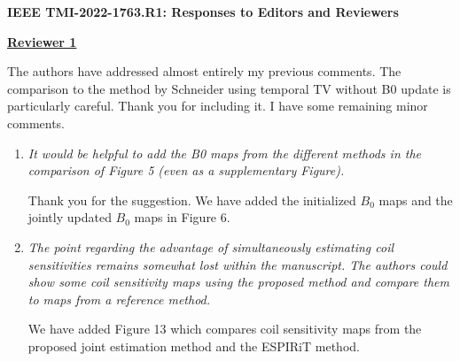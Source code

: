 \documentclass[a4paper,11pt]{report}
\begin{document}
	
\begin{center}
	{\large\textbf{IEEE TMI-2022-1763.R1: Responses to Editors and Reviewers}}
\end{center}




\noindent \underline{\textbf{Reviewer 1}}

\noindent The authors have addressed almost entirely my previous comments. The comparison to the method by Schneider using temporal TV without B0 update is particularly careful. Thank you for including it. I have some remaining minor comments.

\begin{enumerate}
	\item \textit{It would be helpful to add the B0 maps from the different methods in the comparison of Figure 5 (even as a supplementary Figure).}

\hspace{1em} Thank you for the suggestion. 
We have added the initialized $B_0$ maps and the jointly updated $B_0$ maps in Figure 6.

	\item \textit{The point regarding the advantage of simultaneously estimating coil sensitivities remains somewhat lost within the manuscript. The authors could show some coil sensitivity maps using the proposed method and compare them to  maps from a reference method.}

\hspace{1em} We have added Figure 13 which compares coil sensitivity maps from 
the proposed joint estimation method and the ESPIRiT method.

\end{enumerate}
\end{document}

